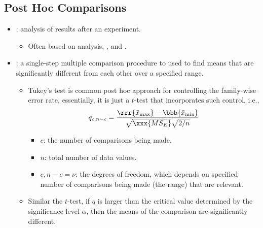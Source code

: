 \begin{itemize}
  \subsection{Post Hoc Comparisons}
  \begin{itemize}
    \item {}: analysis of results after an experiment.
      \begin{itemize}
        \item Often based on \hyperref[Subsection: Multiple Comparisons Problem]{} analysis, \hyperref[Section: Data Visualization]{}, and \hyperref[Section: T-Tests]{}.
      \end{itemize}
    \item {}: a single-step multiple comparison procedure to used to find means that are significantly different from each other over a specified range.
      \begin{itemize}
        \item Tukey's test is common post hoc approach for controlling the family-wise error rate, essentially, it is just a \(t\)-test that incorporates such control, i.e.,
        \[%
        q_{c,n-c} = \frac{\rrr{\bar{x}_{\max}} - \bbb{\bar{x}_{\min}}}{\sqrt{\xxx{MS_E}}\sqrt{2/n}}
        \]%
        \begin{itemize}
          \item \(c\): the number of comparisons being made.
          \item \(n\): total number of data values.
          \item \(c,n-c = \nu\): the degrees of freedom, which depends on specified number of comparisons being made (the range) that are relevant. 
        \end{itemize}
      \item Similar the \(t\)-test, if \(q\) is larger than the critical value determined by the significance level \(\alpha\), then the means of the comparison are significantly different.
      \end{itemize}
  \end{itemize}
  

\end{itemize}
